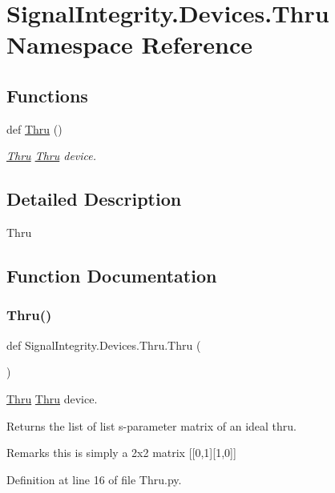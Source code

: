 \hypertarget{namespaceSignalIntegrity_1_1Devices_1_1Thru}{}\section{Signal\+Integrity.\+Devices.\+Thru Namespace Reference}
\label{namespaceSignalIntegrity_1_1Devices_1_1Thru}
\subsection*{Functions}
\begin{DoxyCompactItemize}
\item 
def \hyperlink{namespaceSignalIntegrity_1_1Devices_1_1Thru_abed0100f1a32fb286e8fd9a8341f4ed6}{Thru} ()
\begin{DoxyCompactList}\small\item\em \hyperlink{namespaceSignalIntegrity_1_1Devices_1_1Thru}{Thru} \hyperlink{namespaceSignalIntegrity_1_1Devices_1_1Thru}{Thru} device. \end{DoxyCompactList}\end{DoxyCompactItemize}


\subsection{Detailed Description}
\begin{DoxyVerb}Thru\end{DoxyVerb}
 

\subsection{Function Documentation}
\mbox{\label{namespaceSignalIntegrity_1_1Devices_1_1Thru_abed0100f1a32fb286e8fd9a8341f4ed6}} 
\subsubsection{\texorpdfstring{Thru()}{Thru()}}
{\footnotesize\ttfamily def Signal\+Integrity.\+Devices.\+Thru.\+Thru (\begin{DoxyParamCaption}{ }\end{DoxyParamCaption})}



\hyperlink{namespaceSignalIntegrity_1_1Devices_1_1Thru}{Thru} \hyperlink{namespaceSignalIntegrity_1_1Devices_1_1Thru}{Thru} device. 

\begin{DoxyReturn}{Returns}
the list of list s-\/parameter matrix of an ideal thru. 
\end{DoxyReturn}
\begin{DoxyRemark}{Remarks}
this is simply a 2x2 matrix \mbox{[}\mbox{[}0,1\mbox{]}\mbox{[}1,0\mbox{]}\mbox{]} 
\end{DoxyRemark}


Definition at line 16 of file Thru.\+py.

